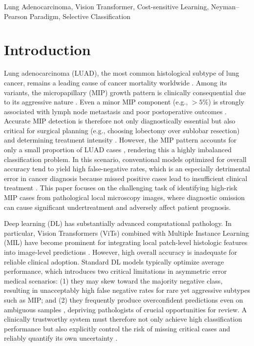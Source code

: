\documentclass[journal,twoside,web]{ieeecolor}
\begin{document}
\begin{IEEEkeywords}
Lung Adenocarcinoma, Vision Transformer, Cost-sensitive Learning, Neyman--Pearson Paradigm, Selective Classification
\end{IEEEkeywords}

\section{Introduction}

Lung adenocarcinoma (LUAD), the most common histological subtype of lung cancer, remains a leading cause of cancer mortality worldwide \cite{bray2024global,luo2025estimated}. Among its variants, the micropapillary (MIP) growth pattern is clinically consequential due to its aggressive nature \cite{wang2020both,travis20152015}. Even a minor MIP component (e.g., $>5\%$) is strongly associated with lymph node metastasis and poor postoperative outcomes \cite{caso2020underlying, dai2017tumor}. Accurate MIP detection is therefore not only diagnostically essential but also critical for surgical planning (e.g., choosing lobectomy over sublobar resection) and determining treatment intensity \cite{dai2017tumor}. However, the MIP pattern accounts for only a small proportion of LUAD cases \cite{emoto2019expansion}, rendering this a highly imbalanced classification problem. In this scenario, conventional models optimized for overall accuracy tend to yield high false-negative rates, which is an especially detrimental error in cancer diagnosis because missed positive cases lead to insufficient clinical treatment \cite{araf2024cost}. This paper focuses on the challenging task of identifying high-risk MIP cases from pathological local microscopy images, where diagnostic omission can cause significant undertreatment and adversely affect patient prognosis.


Deep learning (DL) has substantially advanced computational pathology. In particular, Vision Transformers (ViTs) \cite{dosovitskiy2020image} combined with Multiple Instance Learning (MIL) \cite{ilse2018attention} have become prominent for integrating local patch-level histologic features into image-level predictions \cite{campanella2019clinical, lu2021data, ilse2018attention,an2024transformer}. However, high overall accuracy is inadequate for reliable clinical adoption. Standard DL models typically optimize average performance, which introduces two critical limitations in asymmetric error medical scenarios: (1) they may skew toward the majority negative class, resulting in unacceptably high false negative rates for rare yet aggressive subtypes such as MIP; and (2) they frequently produce overconfident predictions even on ambiguous samples \cite{hendrycks2016baseline}, depriving pathologists of crucial opportunities for review. A clinically trustworthy system must therefore not only achieve high classification performance but also explicitly control the risk of missing critical cases and reliably quantify its own uncertainty \cite{dvijotham2023enhancing}.
\end{document}
